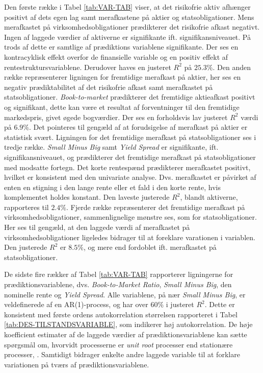 \documentclass[
  a4paper,
  oneside]{memoir}
\begin{document}
Den første række i Tabel \ref{tab:VAR-TAB} viser, at det risikofrie aktiv afhænger positivt af dets egen lag samt merafkastene på aktier og statsobligationer. Mens merafkastet på virksomhedsobligationer prædikterer det risikofrie afkast negativt. Ingen af laggede værdier af aktiverne er signifikante ift. signifikansniveauet. På trods af dette er samtlige af prædiktions variablene signifikante. Der ses en kontracyklisk effekt overfor de finansielle variable og en positiv effekt af rentestruktursvariablene. Derudover haves en justeret \(R^2\) på \(25.3\%\). Den anden række repræsenterer ligningen for fremtidige merafkast på aktier, her ses en negativ prædiktabilitet af det risikofrie afkast samt merafkastet på statsobligationer. \emph{Book-to-market} prædikterer det fremtidige aktieafkast positivt og signifikant, dette kan være et resultat af forventninger til den fremtidige markedspris, givet øgede bogværdier. Der ses en forholdsvis lav justeret \(R^2\) værdi på \(6.9\%\). Det pointeres til gengæld af \citep{CampVicCha2003} at forudsigelse af merafkast på aktier er statistisk svært. Ligningen for det fremtidige merafkast på statsobligationer ses i tredje række. \emph{Small Minus Big} samt \emph{Yield Spread} er signifikante, ift. signifikansniveauet, og prædikterer det fremtidige merafkast på statsobligationer med modsatte fortegn. Det korte rentespænd prædikterer merafkastet positivt, hvilket er konsistent med den univariate analyse. Dvs. merafkastet er påvirket af enten en stigning i den lange rente eller et fald i den korte rente, hvis komplementet holdes konstant. Den laveste justerede \(R^2\), blandt aktiverne, rapporteres til \(2.4\%\). Fjerde række repræsenterer det fremtidige merafkast på virksomhedsobligationer, sammenlignelige mønstre ses, som for statsobligationer. Her ses til gengæld, at den laggede værdi af merafkastet på virksomhedsobligationer ligeledes bidrager til at foreklare varationen i variablen. Den justerede \(R^2\) er \(8.5\%\), og mere end fordoblet ift. merafkastet på statsobligationer.

De sidste fire rækker af Tabel \ref{tab:VAR-TAB} rapporterer ligningerne for prædiktionsvariablene, dvs. \emph{Book-to-Market Ratio}, \emph{Small Minus Big}, den nominelle rente og \emph{Yield Spread}. Alle variablene, på nær \emph{Small Minus Big}, er veldefinerede af en AR(1)-process, og har over \(60\%\) i justeret \(R^2\). Dette er konsistent med første ordens autokorrelation størrelsen rapporteret i Tabel \ref{tab:DES-TILSTANDSVARIABLE}, som indikerer høj autokorrelation. De høje koefficient estimater af de laggede værdier af prædiktionsvariablene kan sætte spørgsmål om, hvorvidt processerne er \emph{unit root} processer end stationære processer, \citep{JurVic2011}. Samtidigt bidrager enkelte andre laggede variable til at forklare variationen på tværs af prædiktionsvariablene.
\end{document}
